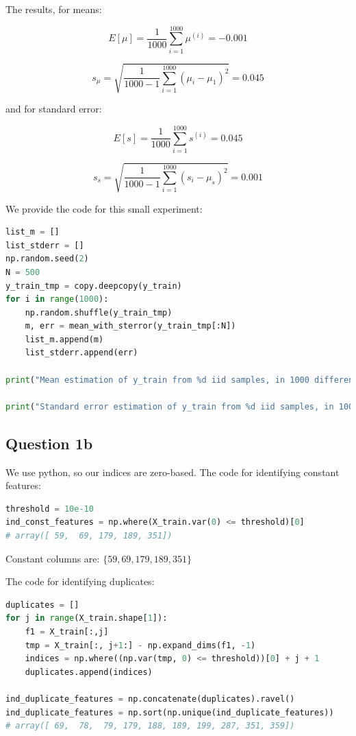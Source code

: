 \documentclass{article}
\begin{document}
The results, for means:

$$ \displaystyle  E[\mu] = \frac{1}{1000} \sum_{i=1}^{1000} \mu^{(i)} = -0.001 $$

$$ \displaystyle s_\mu = \sqrt{  \frac{1}{1000 - 1} \sum_{i=1}^{1000} (\mu_i - \mu_1)^2} = 0.045 $$

and for standard error:

$$ \displaystyle  E[s] = \frac{1}{1000} \sum_{i=1}^{1000} s^{(i)} = 0.045 $$

$$ \displaystyle s_s = \sqrt{  \frac{1}{1000 - 1} \sum_{i=1}^{1000} (s_i - \mu_{s})^2} = 0.001 $$

We provide the code for this small experiment:

\begin{lstlisting}[language = Python]
list_m = []
list_stderr = []
np.random.seed(2)
N = 500
y_train_tmp = copy.deepcopy(y_train)
for i in range(1000):
    np.random.shuffle(y_train_tmp)
    m, err = mean_with_sterror(y_train_tmp[:N])
    list_m.append(m)
    list_stderr.append(err)

print("Mean estimation of y_train from %d iid samples, in 1000 different executions has mean: %.3f and standard deviation: %.3f" %(N, np.mean(list_m), np.std(list_m, ddof=1)))

print("Standard error estimation of y_train from %d iid samples, in 1000 different executions has mean: %.3f and standard deviation: %.3f" %(N, np.mean(list_stderr), np.std(list_stderr, ddof = 1)))
\end{lstlisting}

\subsection*{Question 1b}

We use python, so our indices are zero-based. 
The code for identifying constant features:
\begin{lstlisting}[language = Python]
threshold = 10e-10
ind_const_features = np.where(X_train.var(0) <= threshold)[0]
# array([ 59,  69, 179, 189, 351])
\end{lstlisting}
Constant columns are: $\{59,  69, 179, 189, 351\}$


The code for identifying duplicates:
\begin{lstlisting}[language = Python]
duplicates = []
for j in range(X_train.shape[1]):
    f1 = X_train[:,j]
    tmp = X_train[:, j+1:] - np.expand_dims(f1, -1)
    indices = np.where((np.var(tmp, 0) <= threshold))[0] + j + 1
    duplicates.append(indices)

ind_duplicate_features = np.concatenate(duplicates).ravel()
ind_duplicate_features = np.sort(np.unique(ind_duplicate_features))
# array([ 69,  78,  79, 179, 188, 189, 199, 287, 351, 359])
\end{lstlisting}
\end{document}
